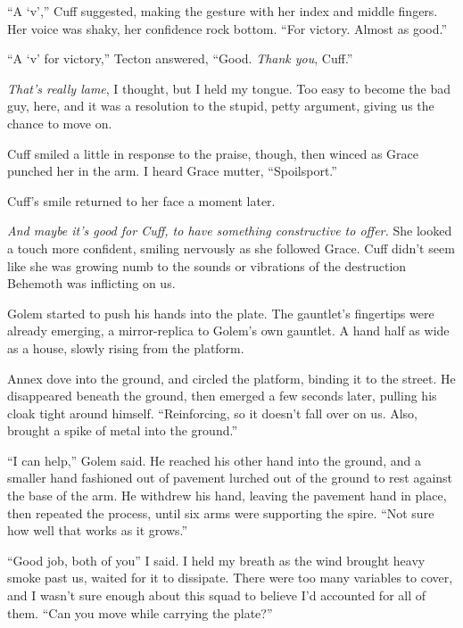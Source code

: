 ``A `v','' Cuff suggested, making the gesture with her index and middle fingers.  Her voice was shaky, her confidence rock bottom.  ``For victory.  Almost as good.''



``A `v' for victory,'' Tecton answered, ``Good.  \emph{Thank you}, Cuff.''



\emph{That's really lame}, I thought, but I held my tongue.  Too easy to become the bad guy, here, and it was a resolution to the stupid, petty argument, giving us the chance to move on.



Cuff smiled a little in response to the praise, though, then winced as Grace punched her in the arm.  I heard Grace mutter, ``Spoilsport.''



Cuff's smile returned to her face a moment later.



\emph{And maybe it's good for Cuff, to have something constructive to offer.  }She looked a touch more confident, smiling nervously as she followed Grace.  Cuff didn't seem like she was growing numb to the sounds or vibrations of the destruction Behemoth was inflicting on us.



Golem started to push his hands into the plate.  The gauntlet's fingertips were already emerging, a mirror-replica to Golem's own gauntlet.  A hand half as wide as a house, slowly rising from the platform.



Annex dove into the ground, and circled the platform, binding it to the street.  He disappeared beneath the ground, then emerged a few seconds later, pulling his cloak tight around himself.  ``Reinforcing, so it doesn't fall over on us.  Also, brought a spike of metal into the ground.''



``I can help,'' Golem said.  He reached his other hand into the ground, and a smaller hand fashioned out of pavement lurched out of the ground to rest against the base of the arm.  He withdrew his hand, leaving the pavement hand in place, then repeated the process, until six arms were supporting the spire.  ``Not sure how well that works as it grows.''



``Good job, both of you'' I said.  I held my breath as the wind brought heavy smoke past us, waited for it to dissipate.  There were too many variables to cover, and I wasn't sure enough about this squad to believe I'd accounted for all of them.  ``Can you move while carrying the plate?''



